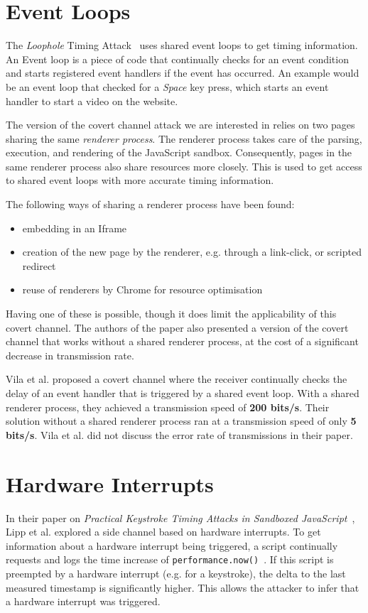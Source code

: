 \documentclass[11pt,
  titlepage=false,
  parskip=half,      %
]{scrreprt}
\begin{document}
\section{Event Loops}
The \textit{Loophole} Timing Attack~\cite{vila2017loophole} uses shared event loops to get timing information.
An Event loop is a piece of code that continually checks for an event condition
and starts registered event handlers if the event has occurred.
An example would be an event loop that checked for a \textit{Space} key press,
which starts an event handler to start a video on the website.

The version of the covert channel attack we are interested in relies on two pages sharing the same \textit{renderer process}.
The renderer process takes care of the parsing, execution, and rendering of the JavaScript sandbox.
Consequently, pages in the same renderer process also share resources more closely.
This is used to get access to shared event loops with more accurate timing information.

The following ways of sharing a renderer process have been found:

\begin{itemize}
    \item embedding in an Iframe
    \item creation of the new page by the renderer, e.g. through a link-click, or scripted redirect
    \item reuse of renderers by Chrome for resource optimisation
\end{itemize}

Having one of these is possible, though it does limit the applicability of this covert channel.
The authors of the paper also presented a version of the covert channel that works without a shared renderer process,
at the cost of a significant decrease in transmission rate.

Vila et al. proposed a covert channel where the receiver continually checks the delay of an event handler
that is triggered by a shared event loop.
With a shared renderer process, they achieved a transmission speed of \textbf{200 bits/s}.
Their solution without a shared renderer process ran at a transmission speed of only \textbf{5 bits/s}.
Vila et al. did not discuss the error rate of transmissions in their paper.

\section{Hardware Interrupts}
In their paper on \textit{Practical Keystroke Timing Attacks in Sandboxed JavaScript}~\cite{lipp2017practical},
Lipp et al. explored a side channel based on hardware interrupts.
To get information about a hardware interrupt being triggered,
a script continually requests and logs the time increase of \texttt{performance.now()}~\cite{performancenow}.
If this script is preempted by a hardware interrupt (e.g. for a keystroke),
the delta to the last measured timestamp is significantly higher.
This allows the attacker to infer that a hardware interrupt was triggered.
\end{document}

